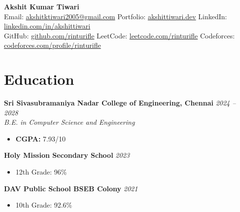\documentclass[10pt,a4paper]{article}
\begin{document}
\pagestyle{empty}

\begin{center}
    {\Huge \bfseries Akshit Kumar Tiwari} \\[4pt]
    \small
    Email: \href{mailto:akshitktiwari2005@gmail.com}{akshitktiwari2005@gmail.com} \quad
    Portfolio: \href{https://akshittiwari.dev}{akshittiwari.dev} \quad
    LinkedIn: \href{https://www.linkedin.com/in/akshittiwari}{linkedin.com/in/akshittiwari} \\
    GitHub: \href{https://github.com/rinturifle}{github.com/rinturifle} \quad
    LeetCode: \href{https://leetcode.com/rinturifle}{leetcode.com/rinturifle} \quad
    Codeforces: \href{https://codeforces.com/profile/rinturifle}{codeforces.com/profile/rinturifle}
\end{center}

\vspace{0.5ex}

\section*{Education}
\noindent\textbf{Sri Sivasubramaniya Nadar College of Engineering, Chennai} \hfill \textit{2024 -- 2028} \\
\textit{B.E. in Computer Science and Engineering}
\begin{itemize}
    \item \small \textbf{CGPA:} 7.93/10
\end{itemize}

\noindent\textbf{Holy Mission Secondary School} \hfill \textit{2023}
\begin{itemize}
    \item \small 12th Grade: 96\%
\end{itemize}

\noindent\textbf{DAV Public School BSEB Colony} \hfill \textit{2021}
\begin{itemize}
    \item \small 10th Grade: 92.6\%
\end{itemize}

\end{document}
